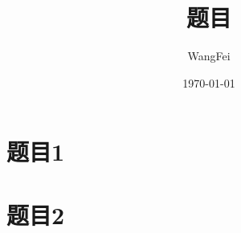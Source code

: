 \documentclass{article}
\title{题目}
\author{WangFei}
\date{\today}
\begin{document}
\maketitle
\tableofcontents
\section{题目1}
\section{题目2}
\end{document}
